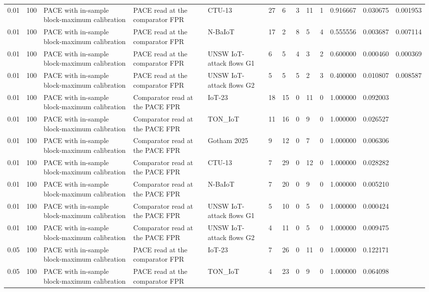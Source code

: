\begin{tabular}{lllllllllllll}
0.01 & 100 & PACE with in-sample block-maximum calibration & PACE read at the comparator FPR & CTU-13 & 27 & 6 & 3 & 11 & 1 & 0.916667 & 0.030675 & 0.001953 \\
0.01 & 100 & PACE with in-sample block-maximum calibration & PACE read at the comparator FPR & N-BaIoT & 17 & 2 & 8 & 5 & 4 & 0.555556 & 0.003687 & 0.007114 \\
0.01 & 100 & PACE with in-sample block-maximum calibration & PACE read at the comparator FPR & UNSW IoT-attack flows G1 & 6 & 5 & 4 & 3 & 2 & 0.600000 & 0.000460 & 0.000369 \\
0.01 & 100 & PACE with in-sample block-maximum calibration & PACE read at the comparator FPR & UNSW IoT-attack flows G2 & 5 & 5 & 5 & 2 & 3 & 0.400000 & 0.010807 & 0.008587 \\
0.01 & 100 & PACE with in-sample block-maximum calibration & Comparator read at the PACE FPR & IoT-23 & 18 & 15 & 0 & 11 & 0 & 1.000000 & 0.092003 &  \\
0.01 & 100 & PACE with in-sample block-maximum calibration & Comparator read at the PACE FPR & TON\_IoT & 11 & 16 & 0 & 9 & 0 & 1.000000 & 0.026527 &  \\
0.01 & 100 & PACE with in-sample block-maximum calibration & Comparator read at the PACE FPR & Gotham 2025 & 9 & 12 & 0 & 7 & 0 & 1.000000 & 0.006306 &  \\
0.01 & 100 & PACE with in-sample block-maximum calibration & Comparator read at the PACE FPR & CTU-13 & 7 & 29 & 0 & 12 & 0 & 1.000000 & 0.028282 &  \\
0.01 & 100 & PACE with in-sample block-maximum calibration & Comparator read at the PACE FPR & N-BaIoT & 7 & 20 & 0 & 9 & 0 & 1.000000 & 0.005210 &  \\
0.01 & 100 & PACE with in-sample block-maximum calibration & Comparator read at the PACE FPR & UNSW IoT-attack flows G1 & 5 & 10 & 0 & 5 & 0 & 1.000000 & 0.000424 &  \\
0.01 & 100 & PACE with in-sample block-maximum calibration & Comparator read at the PACE FPR & UNSW IoT-attack flows G2 & 4 & 11 & 0 & 5 & 0 & 1.000000 & 0.009475 &  \\
0.05 & 100 & PACE with in-sample block-maximum calibration & PACE read at the comparator FPR & IoT-23 & 7 & 26 & 0 & 11 & 0 & 1.000000 & 0.122171 &  \\
0.05 & 100 & PACE with in-sample block-maximum calibration & PACE read at the comparator FPR & TON\_IoT & 4 & 23 & 0 & 9 & 0 & 1.000000 & 0.064098 &  \\

\end{tabular}
